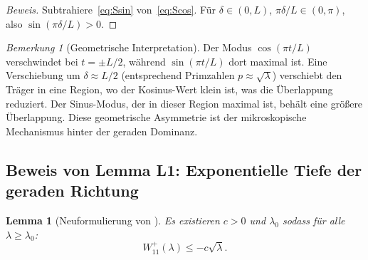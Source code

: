 ﻿\documentclass[12pt,a4paper]{article}
\newtheorem{lemma}[theorem]{Lemma}
\theoremstyle{definition}
\theoremstyle{remark}
\newtheorem{remark}[theorem]{Bemerkung}
\begin{document}
\begin{proof}[Beweis]
Subtrahiere~\eqref{eq:Ssin} von~\eqref{eq:Scos}. Für $\delta \in (0, L)$, $\pi\delta/L \in (0, \pi)$, also $\sin(\pi\delta/L) > 0$.
\end{proof}

\begin{remark}[Geometrische Interpretation]
Der Modus $\cos(\pi t/L)$ verschwindet bei $t = \pm L/2$, während $\sin(\pi t/L)$ dort maximal ist. Eine Verschiebung um $\delta \approx L/2$ (entsprechend Primzahlen $p \approx \sqrt{\lambda}$) verschiebt den Träger in eine Region, wo der Kosinus-Wert klein ist, was die Überlappung reduziert. Der Sinus-Modus, der in dieser Region maximal ist, behält eine größere Überlappung. Diese geometrische Asymmetrie ist der mikroskopische Mechanismus hinter der geraden Dominanz.
\end{remark}

\subsection{Beweis von Lemma L1: Exponentielle Tiefe der geraden Richtung}

\begin{lemma}[Neuformulierung von ]
Es existieren $c > 0$ und $\lambda_0$ sodass für alle $\lambda \geq \lambda_0$:
\[
  W_{11}^+(\lambda) \leq -c\sqrt{\lambda}.
\]
\end{lemma}
\end{document}
